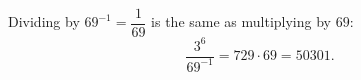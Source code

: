 Dividing by $69^{-1}=\dfrac1{69}$ is the same as multiplying by $69$:
\[\dfrac{3^6}{69^{-1}}=729\cdot69=\boxed{50301}.\]
